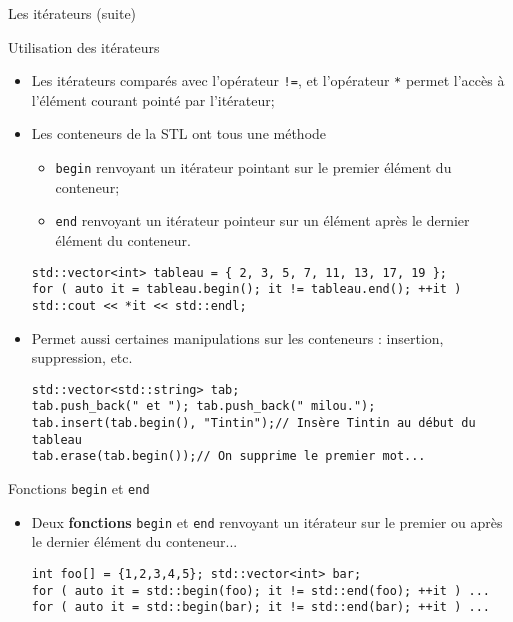 \documentclass[handout,10pt]{beamer}
\begin{document}
\begin{frame}[fragile]{Les itérateurs (suite)}
\tiny
\begin{block}{Utilisation des itérateurs}
\begin{itemize}
 \item Les itérateurs comparés avec l'opérateur \lstinline$!=$, et l'opérateur \lstinline$*$ permet l'accès à l'élément courant pointé par l'itérateur;
 \item Les conteneurs de la STL ont tous une méthode 
  \begin{itemize}
  \item \lstinline$begin$ renvoyant un itérateur pointant sur le premier élément du conteneur;
  \item \lstinline$end$ renvoyant un itérateur pointeur sur un élément après le dernier élément du conteneur.
  \end{itemize}
\begin{lstlisting}
std::vector<int> tableau = { 2, 3, 5, 7, 11, 13, 17, 19 };
for ( auto it = tableau.begin(); it != tableau.end(); ++it ) std::cout << *it << std::endl;\end{lstlisting}
  \item Permet aussi certaines manipulations sur les conteneurs : insertion, suppression, etc.
\begin{lstlisting}
std::vector<std::string> tab;
tab.push_back(" et "); tab.push_back(" milou.");
tab.insert(tab.begin(), "Tintin");// Insère Tintin au début du tableau
tab.erase(tab.begin());// On supprime le premier mot...
\end{lstlisting}
\end{itemize}
\end{block}
\begin{alertblock}{Fonctions \lstinline$begin$ et \lstinline$end$}
\begin{itemize}
 \item Deux \textbf{fonctions} \lstinline$begin$ et \lstinline$end$ renvoyant un itérateur sur le premier ou après
 le dernier élément du conteneur...
\begin{lstlisting}
int foo[] = {1,2,3,4,5}; std::vector<int> bar;
for ( auto it = std::begin(foo); it != std::end(foo); ++it ) ...
for ( auto it = std::begin(bar); it != std::end(bar); ++it ) ...
\end{lstlisting}
\end{itemize}
\end{alertblock}
\end{frame}
\end{document}
